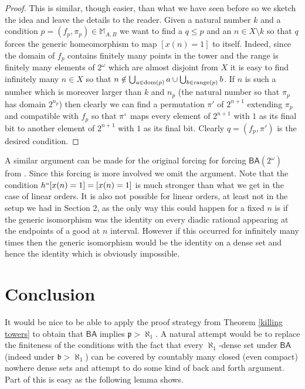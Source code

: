 \documentclass[leqno,11pt]{amsart}
\theoremstyle{definition}
\theoremstyle{remark}
\def\BA{\mathsf{BA}}
\def\cantor{2^\omega}
\def\mfb{\mathfrak b}
\def\mfp{\mathfrak{p}}
\begin{document}
\begin{proof}
    This is similar, though easier, than what we have seen before so we sketch the idea and leave the details to the reader. Given a natural number $k$ and a condition $p = (f_p, \pi_p) \in \mathbb M_{A, B}$ we want to find a $q \leq p$ and an $n \in X \setminus k$ so that $q$ forces the generic homeomorphism to map $[x(n) = 1]$ to itself. Indeed, since the domain of $f_p$ contains finitely many points in the tower and the range is finitely many elements of $\cantor$ which are almost disjoint from $X$ it is easy to find infinitely many $n \in X$ so that $n \notin \bigcup_{a \in {\rm dom}(p)} a \cup \bigcup_{b \in {\rm range}(p)} b$. If $n$ is such a number which is moreover larger than $k$ and $n_p$ (the natural number so that $\pi_p$ has domain $2^{n_p}$) then clearly we can find a permutation $\pi'$ of $2^{n+1}$ extending $\pi_p$ and compatible with $f_p$ so that $\pi`$ maps every element of $2^{n+1}$ with $1$ as its final bit to another element of $2^{n+1}$ with $1$ as its final bit. Clearly $q = (f_p, \pi')$ is the desired condition. 
\end{proof}

A similar argument can be made for the original forcing for forcing $\BA (\cantor)$ from \cite{BaldwinBeaudoin89}. Since this forcing is more involved we omit the argument. Note that the condition $h``[x(n)=1] = [x(n)=1]$ is much stronger than what we get in the case of linear orders. It is also not possible for linear orders, at least not in the setup we had in Section 2, as the only way this could happen for a fixed $n$ is if the generic isomorphism was the identity on every diadic rational appearing at the endpoints of a good at $n$ interval. However if this occurred for infinitely many times then the generic isomorphism would be the identity on a dense set and hence the identity which is obviously impossible. 

\section{Conclusion}

It would be nice to be able to apply the proof strategy from Theorem \ref{killing towers} to obtain that $\BA$ implies $\mfp > \aleph_1$. A natural attempt would be to replace the finiteness of the conditions with the fact that every $\aleph_1$-dense set under $\BA$ (indeed under $\mfb > \aleph_1$) can be covered by countably many closed (even compact) nowhere dense sets and attempt to do some kind of back and forth argument. Part of this is easy as the following lemma shows. 
\end{document}
